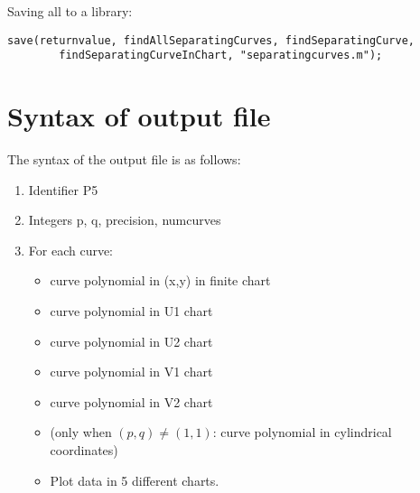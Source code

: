 \documentclass[a4paper,10pt]{article}
\begin{document}
Saving all to a library:

\begin{lstlisting}[name=separatingcurves]
save(returnvalue, findAllSeparatingCurves, findSeparatingCurve,
        findSeparatingCurveInChart, "separatingcurves.m");
\end{lstlisting}

\section{Syntax of output file}

The syntax of the output file is as follows:

\begin{enumerate}
\item
    Identifier P5
\item
    Integers p, q, precision, numcurves
\item
    For each curve:
    \begin{itemize}
    \item
        curve polynomial in (x,y) in finite chart
    \item
        curve polynomial in U1 chart
    \item
        curve polynomial in U2 chart
    \item
        curve polynomial in V1 chart
    \item
        curve polynomial in V2 chart
    \item
        (only when $(p,q)\not=(1,1)$: curve polynomial in cylindrical
        coordinates)
    \item
        Plot data in 5 different charts.
    \end{itemize}
\end{enumerate}
\end{document}
